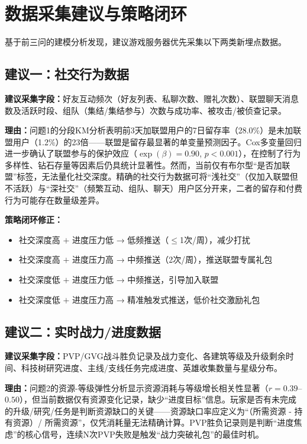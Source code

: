 \section{数据采集建议与策略闭环}

基于前三问的建模分析发现，建议游戏服务器优先采集以下两类新埋点数据。

\subsection{建议一：社交行为数据}

\textbf{建议采集字段：}好友互动频次（好友列表、私聊次数、赠礼次数）、联盟聊天消息数及活跃时段、组队（集结/集结参与）次数与成功率、被攻击/被侦查记录。

\textbf{理由：}问题1的分段KM分析表明前3天加联盟用户的7日留存率（28.0\%）是未加联盟用户（1.2\%）的23倍——联盟是留存最显著的单变量预测因子。Cox多变量回归进一步确认了联盟参与的保护效应（$\exp(\beta) = 0.90$, $p < 0.001$），在控制了行为多样性、钻石存量等因素后仍具统计显著性。然而，当前仅有布尔型``是否加联盟''标签，无法量化社交深度。精确的社交行为数据可将``浅社交''（仅加入联盟但不活跃）与``深社交''（频繁互动、组队、聊天）用户区分开来，二者的留存和付费行为可能存在数量级差异。

\textbf{策略闭环修正：}
\begin{itemize}
    \item 社交深度高 $+$ 进度压力低 → 低频推送（$\leq$1次/周），减少打扰
    \item 社交深度高 $+$ 进度压力高 → 中频推送（2次/周），推送联盟专属礼包
    \item 社交深度低 $+$ 进度压力低 → 中频推送，引导加入联盟
    \item 社交深度低 $+$ 进度压力高 → 精准触发式推送，低价社交激励礼包
\end{itemize}

\subsection{建议二：实时战力/进度数据}

\textbf{建议采集字段：}PVP/GVG战斗胜负记录及战力变化、各建筑等级及升级剩余时间、科技树研究进度、主线/支线任务完成进度、英雄收集数量与星级分布。

\textbf{理由：}问题2的资源-等级弹性分析显示资源消耗与等级增长相关性显著（$r = 0.39$--$0.50$），但当前数据仅有资源变化记录，缺少``进度目标''信息。玩家是否有未完成的升级/研究/任务是判断资源缺口的关键——资源缺口率应定义为``（所需资源 - 持有资源）/ 所需资源''，仅凭消耗量无法精确计算。PVP胜负记录则是判断``进度焦虑''的核心信号，连续N次PVP失败是触发``战力突破礼包''的最佳时机。

